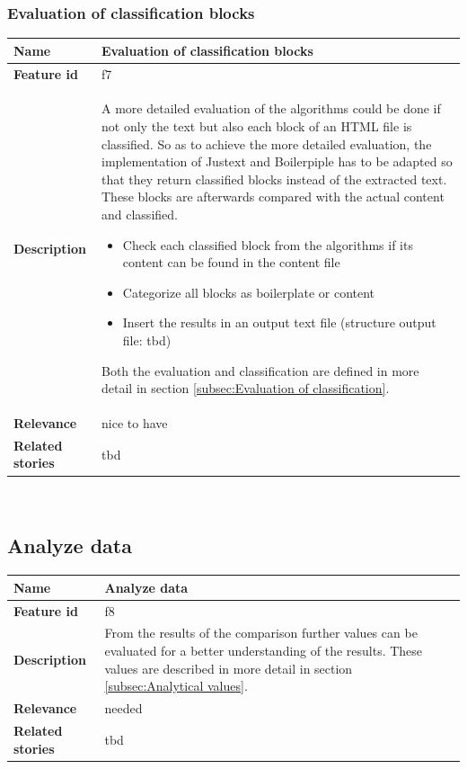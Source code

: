 \subsubsection{Evaluation of classification blocks}
\label{subsec:Evaluation of classification blocks}

	\begin{tabular}{ | p{3cm} | p{12cm} |}
	\hline
	\textbf{Name} 				& Evaluation of classification blocks \\ \hline
	\textbf{Feature id} 		& f7 \\ \hline
	\textbf{Description} 		& A more detailed evaluation of the algorithms could be done if not only the text but also each block of an HTML file is classified. So as to achieve the more detailed evaluation, the implementation of Justext and Boilerpiple has to be adapted so that they return classified blocks instead of the extracted text. These blocks are afterwards compared with the actual content and classified. 
								\begin{itemize}
							        \item Check each classified block from the algorithms if its content can be found in the content file
							        \item Categorize all blocks as boilerplate or content
							        \item Insert the results in an output text file (structure output file: tbd)
						        \end{itemize} 
	Both the evaluation and classification are defined in more detail in section \ref{subsec:Evaluation of classification}.
	\\ \hline
	\textbf{Relevance} 			& nice to have\\ \hline
	\textbf{Related stories} 	& tbd \\ \hline
	\end{tabular} \\





\subsection{Analyze data}
\label{subsec:Analyze data}

	\begin{tabular}{ | p{3cm} | p{12cm} |}
	\hline
	\textbf{Name} 				& Analyze data \\ \hline
	\textbf{Feature id} 		& f8 \\ \hline
	\textbf{Description} 		&  From the results of the comparison further values can be evaluated for a better understanding of the results. These values are described in more detail in section \ref{subsec:Analytical values}.
								    \\ \hline
	\textbf{Relevance} 			& needed \\ \hline
	\textbf{Related stories} 	& tbd \\ \hline
	\end{tabular} \\

